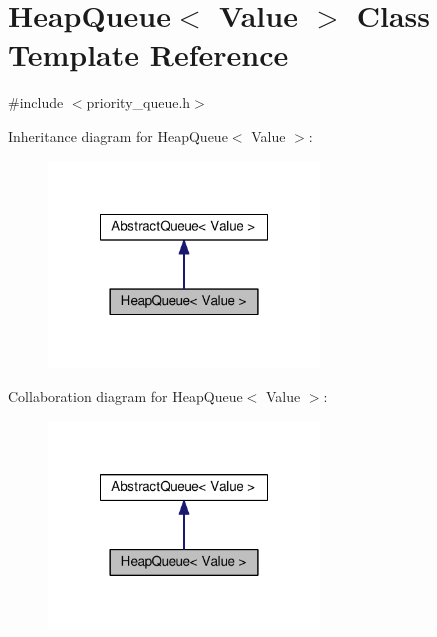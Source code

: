 \hypertarget{classHeapQueue}{\section{Heap\-Queue$<$ Value $>$ Class Template Reference}
\label{classHeapQueue}
}


{\ttfamily \#include $<$priority\-\_\-queue.\-h$>$}



Inheritance diagram for Heap\-Queue$<$ Value $>$\-:
\nopagebreak
\begin{figure}[H]
\begin{center}
\leavevmode
\includegraphics[width=204pt]{classHeapQueue__inherit__graph}
\end{center}
\end{figure}


Collaboration diagram for Heap\-Queue$<$ Value $>$\-:
\nopagebreak
\begin{figure}[H]
\begin{center}
\leavevmode
\includegraphics[width=204pt]{classHeapQueue__coll__graph}
\end{center}
\end{figure}
